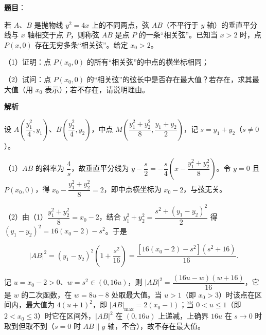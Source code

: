 \begin{answer}

\textbf{题目}：

若 $A$、$B$ 是抛物线 $y^2=4x$ 上的不同两点，弦 $AB$（不平行于 $y$ 轴）的垂直平分线与 $x$ 轴相交于点 $P$，则称弦 $AB$ 是点 $P$ 的一条“相关弦”。已知当 $x>2$ 时，点 $P(x,0)$ 存在无穷多条“相关弦”。给定 $x_0>2$。

（1）证明：点 $P(x_0,0)$ 的所有“相关弦”的中点的横坐标相同；

（2）试问：点 $P(x_0,0)$ 的“相关弦”的弦长中是否存在最大值？若存在，求其最大值（用 $x_0$ 表示）；若不存在，请说明理由。

\textbf{解析}

设 $A\left(\dfrac{y_1^2}4,y_1\right)$、$B\left(\dfrac{y_2^2}4,y_2\right)$，中点 $M\left(\dfrac{y_1^2+y_2^2}8,\dfrac{y_1+y_2}2\right)$，记 $s=y_1+y_2$（$s\neq0$）。

（1）$AB$ 的斜率为 $\dfrac4s$，故垂直平分线为 $y-\dfrac s2=-\dfrac s4\left(x-\dfrac{y_1^2+y_2^2}8\right)$。令 $y=0$ 且 $P(x_0,0)$，得 $x_0-\dfrac{y_1^2+y_2^2}8=2$，即中点横坐标为 $x_0-2$，与弦无关。

（2）由（1）$\dfrac{y_1^2+y_2^2}8=x_0-2$，结合 $y_1^2+y_2^2=\dfrac{s^2+(y_1-y_2)^2}2$ 得 $(y_1-y_2)^2=16(x_0-2)-s^2$。于是

\nopagebreak[4]
\[|AB|^2=(y_1-y_2)^2\left(1+\frac{s^2}{16}\right)=\frac{[16(x_0-2)-s^2](s^2+16)}{16}.\]

记 $u=x_0-2>0$、$w=s^2\in(0,16u)$，则 $|AB|^2=\dfrac{(16u-w)(w+16)}{16}$，它是 $w$ 的二次函数，在 $w=8u-8$ 处取最大值。当 $u>1$（即 $x_0>3$）时该点在区间内，最大值为 $4(u+1)^2$，即 $|AB|_{\max}=2(x_0-1)$；当 $0<u\leqslant1$（即 $2<x_0\leqslant3$）时它在区间外，$|AB|^2$ 在 $(0,16u)$ 上递减，上确界 $16u$ 在 $s\to0$ 时取到但取不到（$s=0$ 时 $AB\parallel y$ 轴，不合），故不存在最大值。


\end{answer}
